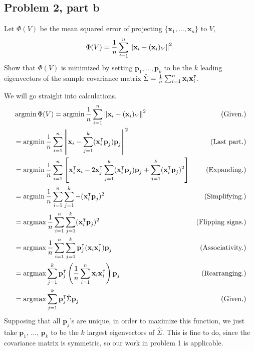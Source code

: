 \newpage
\subsection{Problem 2, part b}
Let $\Phi(V)$ be the mean squared error of projecting $\{\textbf{x}_1, ..., \textbf{x}_n\}$ to $V$,
\[\Phi(V) = \frac{1}{n}\sum_{i = 1}^n \norm{\textbf{x}_i - (\textbf{x}_i)_{V}}^2.\]
Show that $\Phi(V)$ is minimized by setting $\textbf{p}_1, ..., \textbf{p}_k$ to be the $k$ leading eigenvectors of the sample covariance matrix $\hat{\Sigma} = \frac{1}{n}\sum_{i = 1}^n \textbf{x}_i \textbf{x}_i^{\intercal}.$
\partbreak
\begin{solution}

    We will go straight into calculations.
    \tightalignbreak
    \begin{align*}
        &\operatorname*{argmin} \Phi(V) = \operatorname*{argmin} \frac{1}{n}\sum_{i  =1}^n\norm{\textbf{x}_i - (\textbf{x}_i)_V}^2 &\text{(Given.)}\\
        &= \operatorname*{argmin} \frac{1}{n} \sum_{i = 1}^n\norm{\textbf{x}_i - \sum_{j = 1}^k (\textbf{x}_i^{\intercal} \textbf{p}_j)\textbf{p}_j}^2 &\text{(Last part.)}\\
        &= \operatorname*{argmin} \frac{1}{n} \sum_{i  =1}^n\left[ \textbf{x}_i^{\intercal}\textbf{x}_i - 2\textbf{x}_j^{\intercal} \sum_{j = 1}^k (\textbf{x}_i^{\intercal} \textbf{p}_j) \textbf{p}_j + \sum_{j = 1}^k (\textbf{x}_i^{\intercal} \textbf{p}_j)^2\right] &\text{(Expanding.)}\\
        &= \operatorname*{argmin} \frac{1}{n} \sum_{i = 1}^n\sum_{j = 1}^k -(\textbf{x}_i^{\intercal}\textbf{p}_j)^2 &\text{(Simplifying.)}\\
        &= \operatorname*{\arg\!\max} \frac{1}{n}\sum_{i = 1}^n \sum_{j = 1}^k (\textbf{x}_i^{\intercal} \textbf{p}_j)^2 &\text{(Flipping signs.)}\\
        &= \operatorname*{\arg\!\max} \frac{1}{n}\sum_{i = 1}^n\sum_{j = 1}^k \textbf{p}_j^{\intercal}(\textbf{x}_i\textbf{x}_i^{\intercal})\textbf{p}_j &\text{(Associativity.)}\\
        &= \operatorname*{\arg\!\max} \sum_{j  =1}^k \textbf{p}_j^{\intercal} \left(\frac{1}{n}\sum_{i = 1}^n \textbf{x}_i \textbf{x}_i^{\intercal} \right)\textbf{p}_j &\text{(Rearranging.)}\\
        &= \operatorname*{\arg\!\max} \sum_{j = 1}^k \textbf{p}_j^{\intercal} \hat{\Sigma}\textbf{p}_j &\text{(Given.)}
    \end{align*}
    \vspace{-12mm}\alignbreak
    Supposing that all $\textbf{p}_j$'s are unique, in order to maximize this function, we just take $\textbf{p}_1$, ..., $\textbf{p}_k$ to be the $k$ largest eigenvectors of $\hat{\Sigma}$. This is fine to do, since the covariance matrix is symmetric, so our work in problem 1 is applicable. 
\end{solution}

